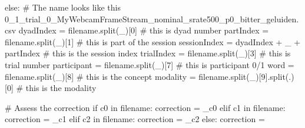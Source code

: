 \documentclass[
  letterpaper,
  DIV=11,
  numbers=noendperiod]{scrreprt}
\newenvironment{Shaded}{\begin{snugshade}}{\end{snugshade}}
\newcommand{\CommentTok}[1]{\textcolor[rgb]{0.37,0.37,0.37}{#1}}
\newcommand{\ControlFlowTok}[1]{\textcolor[rgb]{0.00,0.23,0.31}{#1}}
\newcommand{\DecValTok}[1]{\textcolor[rgb]{0.68,0.00,0.00}{#1}}
\newcommand{\KeywordTok}[1]{\textcolor[rgb]{0.00,0.23,0.31}{#1}}
\newcommand{\NormalTok}[1]{\textcolor[rgb]{0.00,0.23,0.31}{#1}}
\newcommand{\OperatorTok}[1]{\textcolor[rgb]{0.37,0.37,0.37}{#1}}
\newcommand{\StringTok}[1]{\textcolor[rgb]{0.13,0.47,0.30}{#1}}
\begin{document}
\begin{Shaded}
\begin{Highlighting}[]
        \ControlFlowTok{else}\NormalTok{:}
            \CommentTok{\# The name looks like this 0\_1\_trial\_0\_MyWebcamFrameStream\_nominal\_srate500\_p0\_bitter\_geluiden.csv}
\NormalTok{            dyadIndex }\OperatorTok{=}\NormalTok{ filename.split(}\StringTok{\textquotesingle{}\_\textquotesingle{}}\NormalTok{)[}\DecValTok{0}\NormalTok{]   }\CommentTok{\# this is dyad number}
\NormalTok{            partIndex }\OperatorTok{=}\NormalTok{ filename.split(}\StringTok{\textquotesingle{}\_\textquotesingle{}}\NormalTok{)[}\DecValTok{1}\NormalTok{]   }\CommentTok{\# this is part of the session}
\NormalTok{            sessionIndex }\OperatorTok{=}\NormalTok{ dyadIndex }\OperatorTok{+} \StringTok{\textquotesingle{}\_\textquotesingle{}} \OperatorTok{+}\NormalTok{ partIndex }\CommentTok{\# this is the session index}
\NormalTok{            trialIndex }\OperatorTok{=}\NormalTok{ filename.split(}\StringTok{\textquotesingle{}\_\textquotesingle{}}\NormalTok{)[}\DecValTok{3}\NormalTok{] }\CommentTok{\# this is trial number}
\NormalTok{            participant }\OperatorTok{=}\NormalTok{ filename.split(}\StringTok{\textquotesingle{}\_\textquotesingle{}}\NormalTok{)[}\DecValTok{7}\NormalTok{] }\CommentTok{\# this is participant 0/1}
\NormalTok{            word }\OperatorTok{=}\NormalTok{ filename.split(}\StringTok{\textquotesingle{}\_\textquotesingle{}}\NormalTok{)[}\DecValTok{8}\NormalTok{] }\CommentTok{\# this is the concept}
\NormalTok{            modality }\OperatorTok{=}\NormalTok{ filename.split(}\StringTok{\textquotesingle{}\_\textquotesingle{}}\NormalTok{)[}\DecValTok{9}\NormalTok{].split(}\StringTok{\textquotesingle{}.\textquotesingle{}}\NormalTok{)[}\DecValTok{0}\NormalTok{] }\CommentTok{\# this is the modality}

            \CommentTok{\# Assess the correction}
            \ControlFlowTok{if} \StringTok{\textquotesingle{}c0\textquotesingle{}} \KeywordTok{in}\NormalTok{ filename:}
\NormalTok{                correction }\OperatorTok{=} \StringTok{\textquotesingle{}\_c0\textquotesingle{}}
            \ControlFlowTok{elif} \StringTok{\textquotesingle{}c1\textquotesingle{}} \KeywordTok{in}\NormalTok{ filename:}
\NormalTok{                correction }\OperatorTok{=} \StringTok{\textquotesingle{}\_c1\textquotesingle{}}
            \ControlFlowTok{elif} \StringTok{\textquotesingle{}c2\textquotesingle{}} \KeywordTok{in}\NormalTok{ filename:}
\NormalTok{                correction }\OperatorTok{=} \StringTok{\textquotesingle{}\_c2\textquotesingle{}}
            \ControlFlowTok{else}\NormalTok{:}
\NormalTok{                correction }\OperatorTok{=} \StringTok{\textquotesingle{}\textquotesingle{}}


\end{Highlighting}
\end{Shaded}
\end{document}
